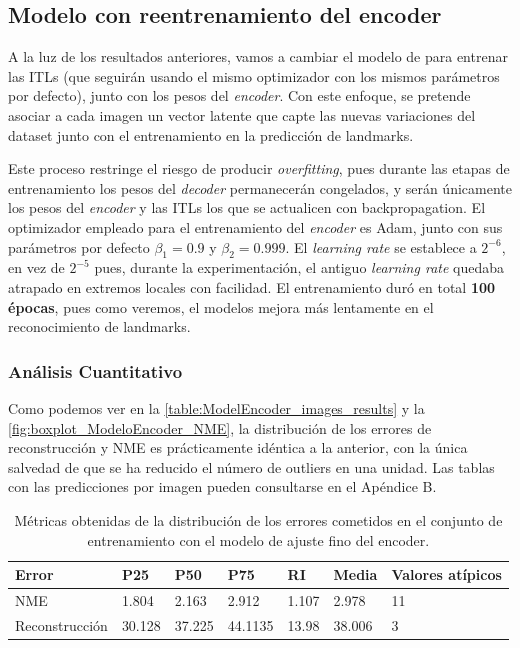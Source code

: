     \subsection{Modelo con reentrenamiento del encoder}
        \noindent A la luz de los resultados anteriores, vamos a cambiar el modelo de para entrenar las ITLs (que seguirán usando el mismo optimizador con los mismos parámetros por defecto), junto con los pesos del \textit{encoder}. Con este enfoque, se pretende asociar a cada imagen un vector latente que capte las nuevas variaciones del dataset junto con el entrenamiento en la predicción de landmarks.

        \medskip

        \noindent Este proceso restringe el riesgo de producir \textit{overfitting}, pues durante las etapas de entrenamiento los pesos del \textit{decoder} permanecerán congelados, y serán únicamente los pesos del \textit{encoder} y las ITLs los que se actualicen con backpropagation. El optimizador empleado para el entrenamiento del \textit{encoder} es Adam, junto con sus parámetros por defecto $\beta_1=0.9$ y $\beta_2=0.999$. El \textit{learning rate} se establece a $2^{-6}$, en vez de $2^{-5}$ pues, durante la experimentación, el antiguo \textit{learning rate} quedaba atrapado en extremos locales con facilidad. El entrenamiento duró en total \textbf{100 épocas}, pues como veremos, el modelos mejora más lentamente en el reconocimiento de landmarks.

        \subsubsection*{Análisis Cuantitativo}

        \noindent Como podemos ver en la \autoref{table:ModelEncoder_images_results} y la \autoref{fig:boxplot_ModeloEncoder_NME}, la distribución de los errores de reconstrucción y NME es prácticamente idéntica a la anterior, con la única salvedad de que se ha reducido el número de outliers en una unidad. Las tablas con las predicciones por imagen pueden consultarse en el Apéndice B.

        \begin{table}[!ht]
            \centering
            \caption{Métricas obtenidas de la distribución de los errores cometidos en el conjunto de entrenamiento con el modelo de ajuste fino del encoder.}
            \begin{tabular}{|l|l|l|l|l|l|l|}
            \hline
            \cellcolor{gray!25}\textbf{Error} & \cellcolor{gray!25}\textbf{P25} & \cellcolor{gray!25}\textbf{P50} & \cellcolor{gray!25}\textbf{P75} & \cellcolor{gray!25}\textbf{RI} & \cellcolor{gray!25}\textbf{Media} & \cellcolor{gray!25}\textbf{Valores atípicos}\\ \hline
                NME & 1.804 & 2.163 & 2.912 & 1.107 & 2.978 & 11 \\ \hline
                Reconstrucción & 30.128 & 37.225 & 44.1135 & 13.98 & 38.006 & 3 \\ \hline
            \end{tabular}
            \label{table:ModelEncoder_images_results}
        \end{table}

